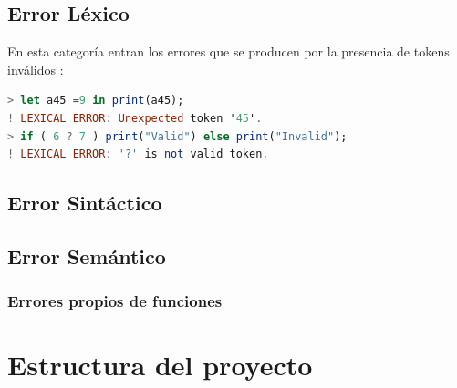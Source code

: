 \documentclass[a4paper, 12pt]{article}
\begin{document}
\subsection{Error Léxico}
En esta categoría entran los errores que se producen por la presencia de tokens inválidos :
\begin{lstlisting}[language= Haskell]
> let a45 =9 in print(a45);
! LEXICAL ERROR: Unexpected token '45'.
> if ( 6 ? 7 ) print("Valid") else print("Invalid");
! LEXICAL ERROR: '?' is not valid token.
\end{lstlisting}
\subsection{Error Sintáctico}
\subsection{Error Semántico}
\subsubsection{Errores propios de funciones}











\newpage
\section{Estructura del proyecto}\label{}


\subsection{}\label{}

\subsection{}\label{}


\subsubsection{}\label{}




\paragraph{\textcolor{blue}{} }\label{}
\end{document}
